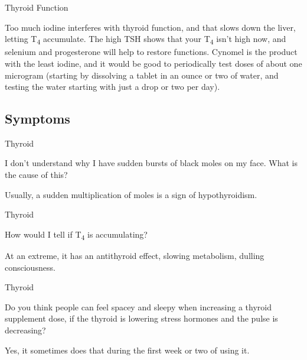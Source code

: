 \documentclass[11pt,oneside,openany,extrafontsizes]{memoir}
\begin{document}
\begin{standalonequote}{Thyroid Function}

    \begin{answer}
      Too much iodine interferes with thyroid function, and that slows down the liver, letting T\textsubscript{4} accumulate. The high TSH shows that your T\textsubscript{4} isn't high now, and selenium and progesterone will help to restore functions. Cynomel is the product with the least iodine, and it would be good to periodically test doses of about one microgram (starting by dissolving a tablet in an ounce or two of water, and testing the water starting with just a drop or two per day).
    \end{answer}
\end{standalonequote}

\subsection{Symptoms}

\begin{qaexchange}{Thyroid}

    \begin{question}
        I don't understand why I have sudden bursts of black moles on my face. What is the cause of this?
    \end{question}

    \begin{answer}
      Usually, a sudden multiplication of moles is a sign of hypothyroidism.
    \end{answer}
\end{qaexchange}

\begin{qaexchange}{Thyroid}

    \begin{question}
        How would I tell if T\textsubscript{4} is accumulating?
    \end{question}

    \begin{answer}
      At an extreme, it has an antithyroid effect, slowing metabolism, dulling consciousness.
    \end{answer}
\end{qaexchange}

\begin{qaexchange}{Thyroid}

    \begin{question}
        Do you think people can feel spacey and sleepy when increasing a thyroid supplement dose, if the thyroid is lowering stress hormones and the pulse is decreasing?
    \end{question}

    \begin{answer}
      Yes, it sometimes does that during the first week or two of using it.
    \end{answer}
\end{qaexchange}
\end{document}
